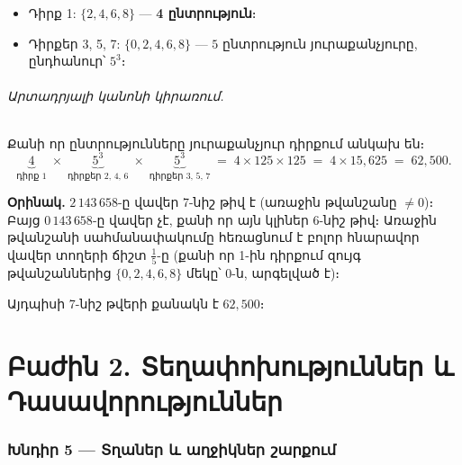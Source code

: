 \documentclass[12pt, a4paper]{article}
\begin{document}
\begin{itemize}[nosep]
  \item Դիրք 1: $\{2, 4, 6, 8\}$ — \textbf{4 ընտրություն}։
  \item Դիրքեր 3, 5, 7: $\{0, 2, 4, 6, 8\}$ — $5$ ընտրություն յուրաքանչյուրը, ընդհանուր՝ $5^3$։
\end{itemize}

\paragraph{Արտադրյալի կանոնի կիրառում.}
Քանի որ ընտրությունները յուրաքանչյուր դիրքում անկախ են։
\[
  \underbrace{4}_{\text{դիրք 1}}
  \;\times\;
  \underbrace{5^3}_{\text{դիրքեր 2, 4, 6}}
  \;\times\;
  \underbrace{5^3}_{\text{դիրքեր 3, 5, 7}}
  \;=\; 4 \times 125 \times 125
  \;=\; 4 \times 15{,}625
  \;=\; 62{,}500.
\]

\textbf{Օրինակ.}\; $2\,143\,658$-ը վավեր 7-նիշ թիվ է (առաջին թվանշանը $\neq 0$)։ Բայց $0\,143\,658$-ը վավեր չէ, քանի որ այն կլիներ 6-նիշ թիվ։ Առաջին թվանշանի սահմանափակումը հեռացնում է բոլոր հնարավոր վավեր տողերի ճիշտ $\frac{1}{5}$-ը (քանի որ 1-ին դիրքում զույգ թվանշաններից $\{0,2,4,6,8\}$ մեկը՝ 0-ն, արգելված է)։

\begin{answerbox}
\centering
Այդպիսի 7-նիշ թվերի քանակն է $\boxed{62{,}500}$։
\end{answerbox}

\newpage
\part*{Բաժին 2. Տեղափոխություններ և Դասավորություններ}

\section{Խնդիր 5 — Տղաներ և աղջիկներ շարքում}
\end{document}
